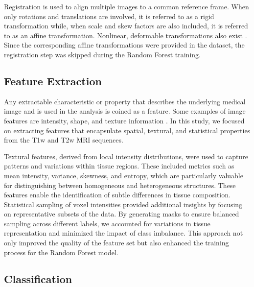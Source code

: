 Registration is used to align multiple images to a common reference frame. When only rotations and translations are involved, it is referred to as a rigid transformation while, when scale and skew factors are also included, it is referred to as an affine transformation. Nonlinear, deformable transformations also exist \cite{b10}. Since the corresponding affine transformations were provided in the dataset, the registration step was skipped during the Random Forest training.

\subsection{Feature Extraction}

Any extractable characteristic or property that describes the underlying medical image and is used in the analysis is coined as a feature. Some examples of image features are intensity, shape, and texture information \cite{b8}. In this study, we focused on extracting features that encapsulate spatial, textural, and statistical properties from the T1w and T2w MRI sequences.

Textural features, derived from local intensity distributions, were used to capture patterns and variations within tissue regions. These included metrics such as mean intensity, variance, skewness, and entropy, which are particularly valuable for distinguishing between homogeneous and heterogeneous structures. These features enable the identification of subtle differences in tissue composition. Statistical sampling of voxel intensities provided additional insights by focusing on representative subsets of the data. By generating masks to ensure balanced sampling across different labels, we accounted for variations in tissue representation and minimized the impact of class imbalance. This approach not only improved the quality of the feature set but also enhanced the training process for the Random Forest model.


\subsection{Classification}

